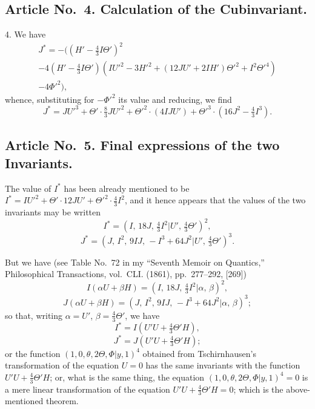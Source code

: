 \documentclass[11pt,a4paper]{article}
\theoremstyle{plain}
\begin{document}
\subsection*{Article No.~4. Calculation of the Cubinvariant.}

4. We have
\begin{multline*}
J^* = -((H' - \tfrac43I\Theta')^2 \\
- 4(H' - \tfrac43I\Theta')(IU'^2 - 3H'^2 + (12JU' + 2IH')\Theta'^2 + I^2\Theta'^4) \\
- 4\Phi'^2),
\end{multline*}
whence, substituting for $-\Phi'^2$ its value and reducing, we find
\[
J^* = JU'^3 + \Theta' \cdot \tfrac83 JU'^2 + \Theta'^2 \cdot (4IJU') + \Theta'^3 \cdot (16J^2 - \tfrac43I^3).
\]

\subsection*{Article No.~5. Final expressions of the two Invariants.}

The value of $I^*$ has been already mentioned to be $I^* = IU'^2 + \Theta' \cdot 12JU' + \Theta'^2 \cdot \tfrac43I^2$, and it hence appears that the values of the two invariants may be written
\[
I^* = (I, \, 18J, \, \tfrac43I^2  |  U', \, \tfrac43\Theta')^2,
\]
\[
J^* = (J, \, I^2, \, 9IJ, \, -I^3 + 64J^2  |  U', \, \tfrac43\Theta')^3.
\]

But we have (see Table No.~72 in my ``Seventh Memoir on Quantics,'' Philosophical Transactions, vol.~CLI. (1861), pp.~277--292, [269])
\[
I(\alpha U + \beta H) = (I, \, 18J, \, \tfrac43I^2  |  \alpha, \, \beta)^2,
\]
\[
J(\alpha U + \beta H) = (J, \, I^2, \, 9IJ, \, -I^3 + 64J^2  |  \alpha, \, \beta)^3;
\]
so that, writing $\alpha = U'$, $\beta = \frac43\Theta'$, we have
\[
I^* = I(U'U + \tfrac43\Theta'H),
\]
\[
J^* = J(U'U + \tfrac43\Theta'H);
\]
or the function $(1, 0, \theta, 2\Theta, \Phi  |  y, 1)^4$ obtained from Tschirnhausen's transformation of the equation $U = 0$ has the same invariants with the function $U'U + \frac43\Theta'H$; or, what is the same thing, the equation $(1, 0, \theta, 2\Theta, \Phi  |  y, 1)^4 = 0$ is a mere linear transformation of the equation $U'U + \frac43\Theta'H = 0$; which is the above-mentioned theorem.

\vspace{1cm}

\end{document}
